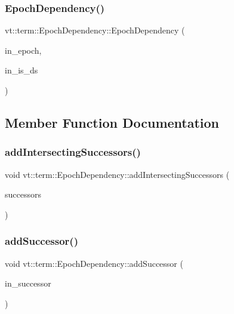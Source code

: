 \subsubsection{\texorpdfstring{Epoch\+Dependency()}{EpochDependency()}}
{\footnotesize\ttfamily vt\+::term\+::\+Epoch\+Dependency\+::\+Epoch\+Dependency (\begin{DoxyParamCaption}\item[{\hyperlink{namespacevt_a985a5adf291c34a3ca263b3378388236}{Epoch\+Type}}]{in\+\_\+epoch,  }\item[{bool}]{in\+\_\+is\+\_\+ds }\end{DoxyParamCaption})\hspace{0.3cm}{\ttfamily [inline]}}



\subsection{Member Function Documentation}
\mbox{\label{structvt_1_1term_1_1_epoch_dependency_a7d50611404480b051f1ec7a6a0b008fb}} 
\subsubsection{\texorpdfstring{add\+Intersecting\+Successors()}{addIntersectingSuccessors()}}
{\footnotesize\ttfamily void vt\+::term\+::\+Epoch\+Dependency\+::add\+Intersecting\+Successors (\begin{DoxyParamCaption}\item[{\hyperlink{structvt_1_1term_1_1_epoch_dependency_a3f00b47c33158f3241ebbeb0a0cb7b1d}{Successor\+Bag\+Type}}]{successors }\end{DoxyParamCaption})}

\mbox{\label{structvt_1_1term_1_1_epoch_dependency_a326947de4ac73460b8779d8837040429}} 
\subsubsection{\texorpdfstring{add\+Successor()}{addSuccessor()}}
{\footnotesize\ttfamily void vt\+::term\+::\+Epoch\+Dependency\+::add\+Successor (\begin{DoxyParamCaption}\item[{\hyperlink{namespacevt_a985a5adf291c34a3ca263b3378388236}{Epoch\+Type} const}]{in\+\_\+successor }\end{DoxyParamCaption})}

